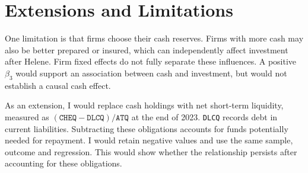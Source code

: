 \section*{Extensions and Limitations}

One limitation is that firms choose their cash reserves. Firms with more cash may also be better prepared or insured, which can independently affect investment after Helene. Firm fixed effects do not fully separate these influences. A positive $\beta_3$ would support an association between cash and investment, but would not establish a causal cash effect.

As an extension, I would replace cash holdings with net short-term liquidity, measured as $(\texttt{CHEQ} - \texttt{DLCQ})/\texttt{ATQ}$ at the end of 2023. \texttt{DLCQ} records debt in current liabilities. Subtracting these obligations accounts for funds potentially needed for repayment. I would retain negative values and use the same sample, outcome and regression. This would show whether the relationship persists after accounting for these obligations.
